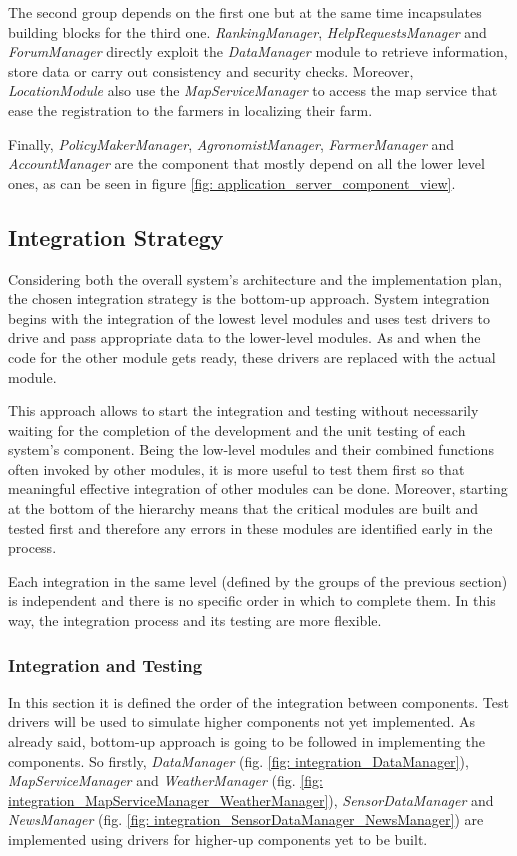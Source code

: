 \documentclass[table, 12pt]{article}
\begin{document}
The second group depends on the first one but at the same time incapsulates building blocks for the third one.  \emph{RankingManager}, \emph{HelpRequestsManager} and \emph{ForumManager} directly exploit the \emph{DataManager} module to retrieve information, store data or carry out consistency and security checks. Moreover, \emph{LocationModule} also use the \emph{MapServiceManager} to access the map service that ease the registration to the farmers in localizing their farm. 

Finally, \emph{PolicyMakerManager}, \emph{AgronomistManager}, \emph{FarmerManager} and \emph{AccountManager} are the component that mostly depend on all the lower level ones, as can be seen in figure \ref{fig: application_server_component_view}.
\subsection{Integration Strategy}
Considering both the overall system's architecture and the implementation
plan, the chosen integration strategy is the bottom-up approach. System
integration begins with the integration of the lowest level modules and uses
test drivers to drive and pass appropriate data to the lower-level modules. As
and when the code for the other module gets ready, these drivers are replaced
with the actual module.

This approach allows to start the integration and testing without necessarily
waiting for the completion of the development and the unit testing of each
system's component. Being the low-level modules and their combined functions
often invoked by other modules, it is more useful to test them first so that
meaningful effective integration of other modules can be done. Moreover,
starting at the bottom of the hierarchy means that the critical modules are built
and tested first and therefore any errors in these modules are identified early in
the process.

Each integration in the same level (defined by the groups of the previous
section) is independent and there is no specific order in which to complete them.
In this way, the integration process and its testing are more flexible.

\subsubsection{Integration and Testing}
In this section it is defined the order of the integration between components. Test drivers will be used to simulate higher components not yet implemented.
As already said, bottom-up approach is going to be followed in implementing the components. So firstly, \emph{DataManager} (fig. \ref{fig: integration_DataManager}), \emph{MapServiceManager} and \emph{WeatherManager} (fig. \ref{fig: integration_MapServiceManager_WeatherManager}), \emph{SensorDataManager} and \emph{NewsManager} (fig. \ref{fig: integration_SensorDataManager_NewsManager}) are implemented using drivers for higher-up components yet to be built.
\end{document}
